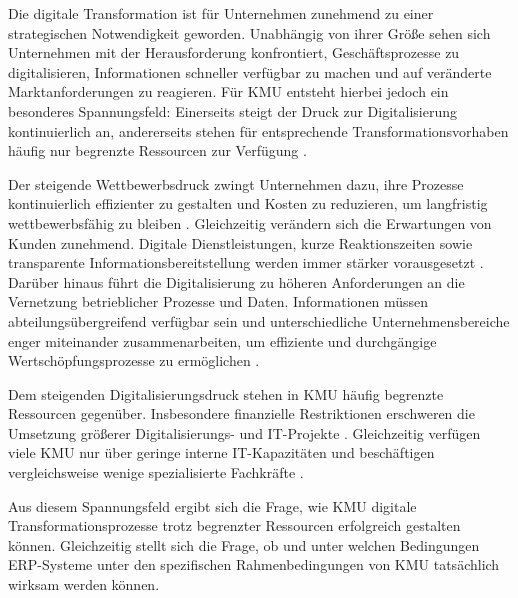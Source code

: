 
Die digitale Transformation ist für Unternehmen zunehmend zu einer strategischen Notwendigkeit geworden. 
Unabhängig von ihrer Größe sehen sich Unternehmen mit der Herausforderung konfrontiert, Geschäftsprozesse 
zu digitalisieren, Informationen schneller verfügbar zu machen und auf veränderte Marktanforderungen zu 
reagieren. Für KMU entsteht hierbei jedoch ein besonderes Spannungsfeld: Einerseits steigt der Druck zur 
Digitalisierung kontinuierlich an, andererseits stehen für entsprechende Transformationsvorhaben häufig 
nur begrenzte Ressourcen zur Verfügung \parencite{Leyh2015,Leyh2019}.

Der steigende Wettbewerbsdruck zwingt Unternehmen dazu, ihre Prozesse kontinuierlich effizienter zu gestalten 
und Kosten zu reduzieren, um langfristig wettbewerbsfähig zu bleiben \parencite{Leyh2015}. Gleichzeitig 
verändern sich die Erwartungen von Kunden zunehmend. Digitale Dienstleistungen, kurze Reaktionszeiten 
sowie transparente Informationsbereitstellung werden immer stärker vorausgesetzt \parencite{Leyh2019}. 
Darüber hinaus führt die Digitalisierung zu höheren Anforderungen an die Vernetzung betrieblicher 
Prozesse und Daten. Informationen müssen abteilungsübergreifend verfügbar sein und unterschiedliche 
Unternehmensbereiche enger miteinander zusammenarbeiten, um effiziente und durchgängige Wertschöpfungsprozesse 
zu ermöglichen \parencite{Leyh2019}.

Dem steigenden Digitalisierungsdruck stehen in KMU häufig begrenzte Ressourcen gegenüber. Insbesondere 
finanzielle Restriktionen erschweren die Umsetzung größerer Digitalisierungs- und IT-Projekte \parencite{Faruque2024}. 
Gleichzeitig verfügen viele KMU nur über geringe interne IT-Kapazitäten und beschäftigen vergleichsweise 
wenige spezialisierte Fachkräfte \parencite{Xia2009, Leyh2015}. 

Aus diesem Spannungsfeld ergibt sich die Frage, wie KMU digitale Transformationsprozesse trotz begrenzter 
Ressourcen erfolgreich gestalten können. Gleichzeitig stellt sich die Frage, ob und unter welchen Bedingungen 
ERP-Systeme unter den spezifischen Rahmenbedingungen von KMU tatsächlich wirksam werden können.
